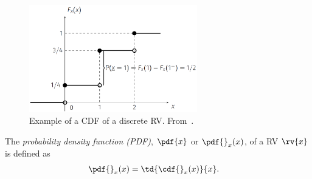 \begin{figure}[h]
    \centering
    \includegraphics[width=0.65\textwidth]{figs/1_RV_example_discrete.PNG}    
    \caption{Example of a CDF of a discrete RV. From~\cite{psaromiligkos_slides_2019}.}
    \label{fig: example CDF discrete RV}
\end{figure}

\begin{mydefinition}
  The \emph{probability density function (PDF)}, $\pdf{x}$ or $\pdf{}_{x}(x)$, of a RV $\rv{x}$ is defined as
  \begin{align}
      \pdf{}_{x}(x) &= \td{\cdf{}_{x}(x)}{x}.
  \end{align}
\end{mydefinition}

